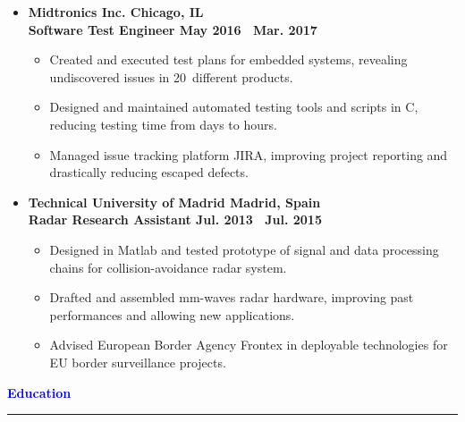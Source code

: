 \documentclass[10pt, letterpaper]{letter}
\def\myplus{\hspace{-.3em}\raisebox{.4ex}{ \tiny +}}
\def\csharp{C\nolinebreak[4]\hspace{-.3em}\raisebox{.25ex}{ \small \#}}
\begin{document}
\begin{itemize}[label=$\bullet$, leftmargin=1em]
\vfill

    \item
    \textbf{Midtronics Inc. \hfill Chicago, IL}\vspace{2pt}\\
    \textbf{Software Test Engineer \hfill May 2016 \textendash\ Mar. 2017}\vspace{2pt}
    \begin{itemize}[nosep, leftmargin=1.15em]
	\item Created and executed test plans for embedded systems, revealing undiscovered issues in 20\myplus\ different products.
	\item Designed and maintained automated testing tools and scripts in \csharp, reducing testing time from days to hours.
        \item Managed issue tracking platform JIRA, improving project reporting and drastically reducing escaped defects.
    \end{itemize}

\vfill

    \item
    \textbf{Technical University of Madrid \hfill Madrid, Spain}\vspace{2pt}\\
    \textbf{Radar Research Assistant \hfill Jul. 2013 \textendash\ Jul. 2015}\vspace{2pt}
    \begin{itemize}[nosep, leftmargin=1.15em]
	\item Designed in Matlab and tested prototype of signal and data processing chains for collision-avoidance radar system.
	\item Drafted and assembled mm-waves radar hardware, improving past performances and allowing new applications.
        \item Advised European Border Agency Frontex in deployable technologies for EU border surveillance projects.
    \end{itemize}

\end{itemize}

\vfill


\textcolor{Blue}{
    \large\textbf{Education}
    \vspace{3pt}
    \hrule height 1.5pt
}
\end{document}
